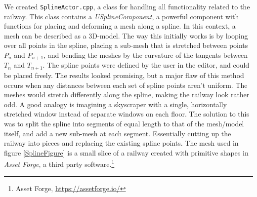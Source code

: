 We created \verb|SplineActor.cpp|, a class for handling all functionality related to the railway. This class contains a \textit{USplineComponent}, a powerful component with functions for placing and deforming a mesh along a spline. In this context, a mesh can be described as a 3D-model. The way this initially works is by looping over all points in the spline, placing a sub-mesh that is stretched between points $P_n$ and $P_{n+1}$, and bending the meshes by the curvature of the tangents between $T_n$ and $T_{n+1}$. The spline points were defined by the user in the editor, and could be placed freely. The results looked promising, but a major flaw of this method occurs when any distances between each set of spline points aren't uniform. The meshes would stretch differently along the spline, making the railway look rather odd. A good analogy is imagining a skyscraper with a single, horizontally stretched window instead of separate windows on each floor. The solution to this was to split the spline into segments of equal length to that of the mesh/model itself, and add a new sub-mesh at each segment. Essentially cutting up the railway into pieces and replacing the existing spline points. The mesh used in figure \ref{SplineFigure} is a small slice of a railway created with primitive shapes in \textit{Asset Forge}, a third party software.\footnote{Asset Forge, \url{https://assetforge.io/}} \\




